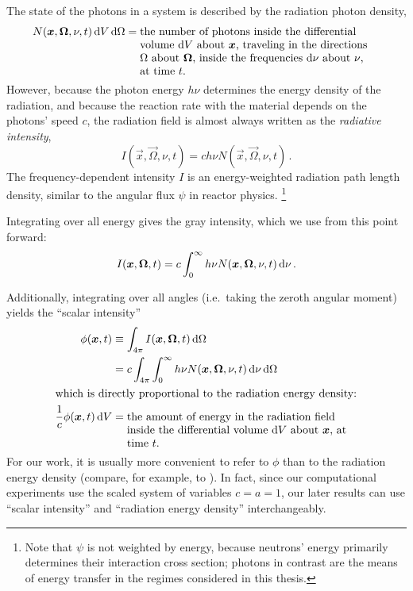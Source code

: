 The state of the photons in a system is described by the radiation photon
density,
\begin{align*}
  N(\vec{x},\vec{\Omega}, \nu, t) \ud V \ud \Omega
  &= \topbox{the number of photons inside the differential volume $\ud V$
  about $\vec{x}$, traveling in the directions $\Omega$ about
  $\vec{\Omega}$, inside the frequencies $\ud \nu$ about $\nu$, at time $t$.}
\end{align*}
However, because the photon energy $h\nu$ determines the energy
density of the radiation, and because the reaction rate with the material
depends on the photons' speed $c$, the radiation field is almost always written
as the \emph{radiative intensity},
\begin{equation*}
  I(\vec{x},\vec{\Omega},\nu, t) = c h\nu N(\vec{x},\vec{\Omega},\nu, t)\,.
\end{equation*}
The frequency-dependent intensity $I$ is an energy-weighted radiation path
length density, similar to the angular flux $\psi$ in reactor physics.%
\footnote{Note that $\psi$ is not weighted by energy, because neutrons' energy
primarily determines their interaction cross section; photons in contrast are
the means of energy transfer in the regimes considered in this thesis.}

Integrating over all energy gives the gray intensity, which we use from this point forward:
\begin{equation*}
  I(\bm{x},\bm{\Omega}, t)
  = c \int_0^\infty h\nu N(\bm{x},\bm{\Omega},\nu, t) \mathop{}\!\mathrm{d}\nu \,.
\end{equation*}

Additionally, integrating over all angles (i.e.~taking the zeroth angular
moment) yields the ``scalar intensity''
\begin{align} \label{eq:intensityZeroth}
  \phi(\vec{x},t) &\equiv \int_{4\pi} I(\vec{x},\vec{\Omega}, t) \ud \Omega
  \\
  &= c \int_{4\pi} \int_0^\infty h\nu N(\vec{x},\vec{\Omega},\nu, t) \ud\nu
   \ud \Omega
\\ \intertext{which is directly proportional to the radiation energy density:}
\nonumber
\frac{1}{c} \phi(\vec{x},t) \ud V
&= \topbox{the amount of energy in the radiation field inside the differential
  volume $\ud V$ about $\vec{x}$, at time $t$.}
\end{align}
For our work, it is usually more convenient to refer to $\phi$ than to the
radiation energy density (compare, for example, \cite{Den2007} to
\cite{Kno1999a}). In fact, since our computational experiments use the
scaled system of variables $c=a=1$, our later results can use ``scalar
intensity'' and ``radiation energy density'' interchangeably.

